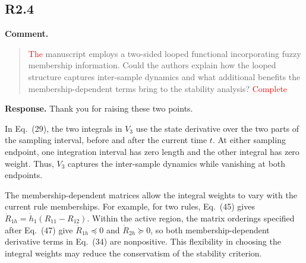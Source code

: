 \documentclass[12pt,a4paper]{article}
\begin{document}
% 
% 

\subsection*{R2.4}

\textbf{Comment.}
\begin{quote}
\raggedright
\textcolor{red}{The} manuscript employs a two-sided looped functional incorporating fuzzy membership information. Could the authors explain how the looped structure captures inter-sample dynamics and what additional benefits the membership-dependent terms bring to the stability analysis? \textcolor{red}{Complete}
\end{quote}

\textbf{Response.}
Thank you for raising these two points.\par
{\setlength{\parskip}{5pt}\indent In Eq.~(29), the two integrals in $V_3$ use the state derivative over the two parts of the sampling interval, before and after the current time $t$. At either sampling endpoint, one integration interval has zero length and the other integral has zero weight. Thus, $V_3$ captures the inter-sample dynamics while vanishing at both endpoints.\par
\indent The membership-dependent matrices allow the integral weights to vary with the current rule memberships. For example, for two rules, Eq.~(45) gives $\dot R_{1h}=\dot h_1(R_{11}-R_{12})$. Within the active region, the matrix orderings specified after Eq.~(47) give $\dot R_{1h}\preceq 0$ and $\dot R_{2h}\succeq 0$, so both membership-dependent derivative terms in Eq.~(34) are nonpositive. This flexibility in choosing the integral weights may reduce the conservatism of the stability criterion.\par}
\end{document}
